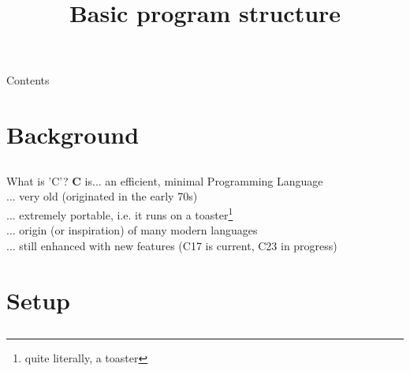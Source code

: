 
\usepackage{tikz}
\usepackage{hyperref}
\hypersetup{
	colorlinks=true,
	linkcolor=darkgray,
	urlcolor=blue,
}

\newcommand{\topic}{
    Basic program structure
}

\title{\topic}
\supertitle{\course}
\date{}



\maketitle

\begin{frame}{Contents}
	\tableofcontents
\end{frame}

\section{Background}
\subsection{}

\begin{frame}{What is 'C'?}
	\textbf{C} is\hspace{3em}... an efficient, minimal Programming Language\\
	\bigskip
	\hspace{3em}... very old (originated in the early 70s)\\
	\bigskip
	\hspace{3em}... extremely portable, i.e. it runs on a toaster\footnote{quite literally, a toaster}\\
	\bigskip
	\hspace{3em}... origin (or inspiration) of many modern languages\\
	\bigskip
	\hspace{3em}... still enhanced with new features (C17 is current, C23 in progress)
\end{frame}

\section{Setup}
\subsection{}

